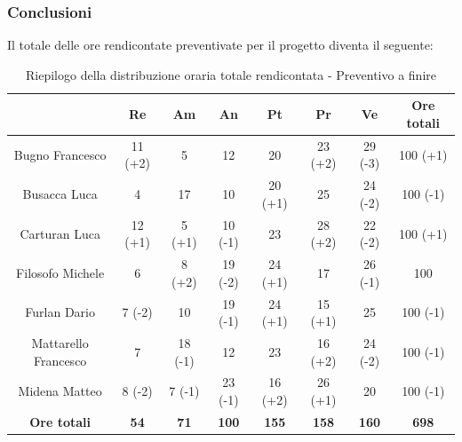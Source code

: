 \subsubsection{Conclusioni} \label{subsubsection:conclusioni}
Il totale delle ore rendicontate preventivate per il progetto diventa il seguente:

\begin{table}[H]
  \centering
  \renewcommand{\arraystretch}{1.8}
  \begin{tabular}{c|c|c|c|c|c|c|c}
    \rowcolor[HTML]{125E28}
    \multicolumn{1}{c}{\color[HTML]{FFFFFF}\textbf{ Nominativo }}
                         & \multicolumn{1}{c}{\color[HTML]{FFFFFF}\textbf{ Re }}
                         & \multicolumn{1}{c}{\color[HTML]{FFFFFF}\textbf{ Am}}
                         & \multicolumn{1}{c}{\color[HTML]{FFFFFF}\textbf{ An }}
                         & \multicolumn{1}{c}{\color[HTML]{FFFFFF}\textbf{ Pt }}
                         & \multicolumn{1}{c}{\color[HTML]{FFFFFF}\textbf{ Pr }}
                         & \multicolumn{1}{c}{\color[HTML]{FFFFFF}\textbf{ Ve }}
                         & \multicolumn{1}{c}{\color[HTML]{FFFFFF}\textbf{ Ore totali }}                                                                                          \\
    \hline
    Bugno Francesco      & 11 (+2)                                                       & 5           & 12           & 20           & 23 (+2)      & 29 (-3)      & 100 (+1)     \\
    Busacca Luca         & 4                                                             & 17          & 10           & 20 (+1)      & 25           & 24 (-2)      & 100 (-1)     \\
    Carturan Luca        & 12 (+1)                                                       & 5 (+1)      & 10 (-1)      & 23           & 28 (+2)      & 22 (-2)      & 100 (+1)     \\
    Filosofo Michele     & 6                                                             & 8 (+2)      & 19 (-2)      & 24 (+1)      & 17           & 26 (-1)      & 100          \\
    Furlan Dario         & 7 (-2)                                                        & 10          & 19 (-1)      & 24 (+1)      & 15 (+1)      & 25           & 100 (-1)     \\
    Mattarello Francesco & 7                                                             & 18 (-1)     & 12           & 23           & 16 (+2)      & 24 (-2)      & 100 (-1)     \\
    Midena Matteo        & 8 (-2)                                                        & 7 (-1)      & 23 (-1)      & 16 (+2)      & 26 (+1)      & 20           & 100 (-1)     \\
    \textbf{Ore totali}  & \textbf{54}                                                   & \textbf{71} & \textbf{100} & \textbf{155} & \textbf{158} & \textbf{160} & \textbf{698}
  \end{tabular}
  \caption{Riepilogo della distribuzione oraria totale rendicontata - Preventivo a finire}
\end{table}

